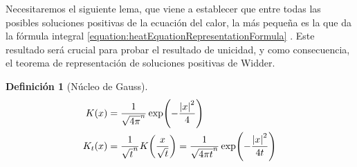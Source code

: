 \documentclass{article}
\theoremstyle{definition}
\newtheorem{definition}{Definición}
\theoremstyle{remark}
\begin{document}
  Necesitaremos el siguiente lema, que viene a establecer que entre todas las posibles soluciones positivas de la ecuación del calor, la más pequeña es la que da la fórmula integral
  \ref{equation:heatEquationRepresentationFormula}  %
  .
  Este resultado será crucial para probar el resultado de unicidad, y como consecuencia, el teorema de representación de soluciones positivas de Widder.

  \begin{definition}[Núcleo de Gauss]
    \begin{align}
      K(x)
      &=
      \frac{1}{\sqrt{4 \pi}^n} \exp\!\left(- \frac{\abs{x}^2}{4}\right)
      \\
      K_t(x)
      &=
      \frac{1}{\sqrt{t}^n} K\!\left(\frac{x}{\sqrt{t}}\right)
      =
      \frac{1}{\sqrt{4 \pi t}^n} \exp\!\left(- \frac{\abs{x}^2}{4 t}\right)
    \end{align}
    
  \end{definition}
\end{document}
